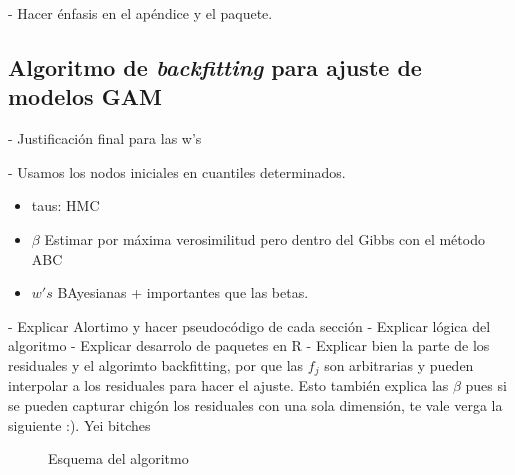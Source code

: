 \documentclass[../Main/Main.tex]{subfiles}
\begin{document}
- Hacer énfasis en el apéndice y el paquete.

\subsection{Algoritmo de \textit{backfitting} para ajuste de modelos GAM} 
- Justificación final para las w's

- Usamos los nodos iniciales en cuantiles determinados.\\
\begin{itemize}
\item taus: HMC
\item $\beta$ Estimar por máxima verosimilitud pero dentro del Gibbs con el método ABC
\item $w's$ BAyesianas + importantes que las betas.
\end{itemize}

- Explicar Alortimo y hacer pseudocódigo de cada sección
- Explicar lógica del algoritmo
- Explicar desarrolo de paquetes en R
- Explicar bien la parte de los residuales y el algorimto backfitting, por que las $f_j$ son arbitrarias y pueden interpolar a los residuales para hacer el ajuste. Esto también explica las $\beta$ pues si se pueden capturar chigón los residuales con una sola dimensión, te vale verga la siguiente :). Yei bitches

\begin{figure}[h]
\centering
{}
\caption{Esquema del algoritmo}
\label{fig:DiagramaAlgoritmo}
\end{figure}
\end{document}
